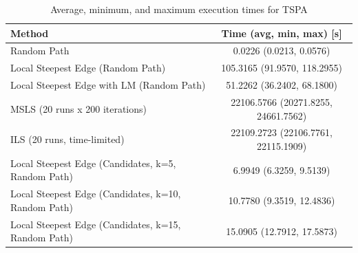 \begin{table}[h!]
\centering
\begin{tabular}{lc}
\hline
Method & Time (avg, min, max) [s] \\
\hline
Random Path & 0.0226 (0.0213, 0.0576) \\
Local Steepest Edge (Random Path) & 105.3165 (91.9570, 118.2955) \\
Local Steepest Edge with LM (Random Path) & 51.2262 (36.2402, 68.1800) \\
MSLS (20 runs x 200 iterations) & 22106.5766 (20271.8255, 24661.7562) \\
ILS (20 runs, time-limited) & 22109.2723 (22106.7761, 22115.1909) \\
Local Steepest Edge (Candidates, k=5, Random Path) & 6.9949 (6.3259, 9.5139) \\
Local Steepest Edge (Candidates, k=10, Random Path) & 10.7780 (9.3519, 12.4836) \\
Local Steepest Edge (Candidates, k=15, Random Path) & 15.0905 (12.7912, 17.5873) \\
\hline
\end{tabular}
\caption{Average, minimum, and maximum execution times for TSPA}
\label{tab:TSPA_timings}
\end{table}
